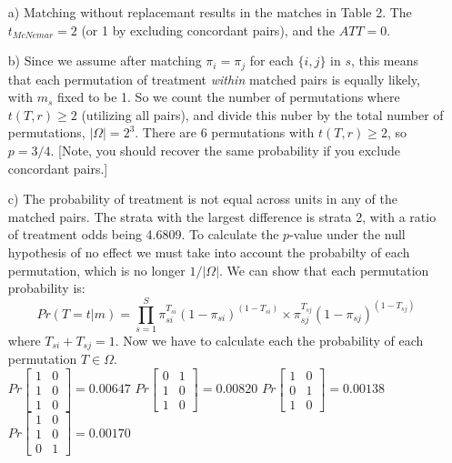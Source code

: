 \documentclass{article}
\begin{document}
\begin{itemize}
\begin{table}[h!!!!!!!]
\begin{center}
\begin{tabular}{cccc|cc}
		\end{tabular}
		\label{}
	\end{center}
\end{table}


\begin{itemize}
\item[a)] Matching without replacemant results in the matches
  in Table 2.  The $t_{McNemar} = 2$ (or 1 by excluding concordant pairs), and the $ATT=0$.
\item[b)] Since we assume after matching $\pi_i = \pi_j$ for each
  $\{i,j\}$ in $s$, this means that each permutation of treatment {\em
  within} matched pairs is equally likely, with $m_s$ fixed to be 1.  So we count the number of permutations
where $t(T,r)\geq 2$ (utilizing all pairs), and divide this nuber by the total number of
permutations, $|\Omega|=2^3$.  There are 6 permutations with
$t(T,r)\geq2$, so $p=3/4$. [Note, you should recover the same
probability if you exclude concordant pairs.]
\item[c)] The probability of treatment is not equal across units in
  any of the matched pairs.  The strata with the largest difference is
  strata 2, with a ratio of treatment odds being 4.6809.  To
  calculate the $p$-value under the null hypothesis of no effect we
  must take into account the probabilty of each permutation, which is
no  longer $1/|\Omega|$.  We can show that each permutation
probability is: 
$$Pr(T=t|m)=\prod_{s=1}^S \pi_{si}^{T_{si}}(1-\pi_{si})^{(1-T_{si})}
\times \pi_{sj}^{T_{sj}}(1-\pi_{sj})^{(1-T_{sj})}$$
where $T_{si}+T_{sj}=1$.  Now we have to calculate each the
probability of each permutation $T\in\Omega$.\\

$Pr \left[ \begin{smallmatrix} 1&0 \\ 1&0 \\   1&0  \end{smallmatrix}\right] = 0.00647 $ \hspace{2em}
$Pr \left[ \begin{smallmatrix} 0&1 \\ 1&0 \\   1&0  \end{smallmatrix}\right] = 0.00820 $ \hspace{2em}
$Pr \left[ \begin{smallmatrix} 1&0 \\ 0&1 \\   1&0  \end{smallmatrix}\right] = 0.00138 $ \hspace{2em}
$Pr \left[ \begin{smallmatrix} 1&0 \\ 1&0 \\   0&1  \end{smallmatrix}\right] = 0.00170 $ \hspace{2em}\vspace{1em}


\end{itemize}
\end{itemize}
\end{document}
